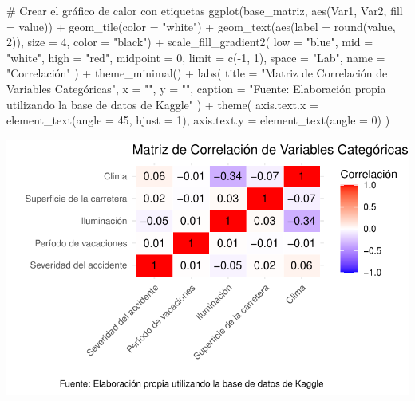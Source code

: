 \documentclass[
  letterpaper,
  DIV=11,
  numbers=noendperiod]{scrartcl}
\newenvironment{Shaded}{\begin{snugshade}}{\end{snugshade}}
\newcommand{\AttributeTok}[1]{\textcolor[rgb]{0.40,0.45,0.13}{#1}}
\newcommand{\CommentTok}[1]{\textcolor[rgb]{0.37,0.37,0.37}{#1}}
\newcommand{\DecValTok}[1]{\textcolor[rgb]{0.68,0.00,0.00}{#1}}
\newcommand{\FunctionTok}[1]{\textcolor[rgb]{0.28,0.35,0.67}{#1}}
\newcommand{\NormalTok}[1]{\textcolor[rgb]{0.00,0.23,0.31}{#1}}
\newcommand{\SpecialCharTok}[1]{\textcolor[rgb]{0.37,0.37,0.37}{#1}}
\newcommand{\StringTok}[1]{\textcolor[rgb]{0.13,0.47,0.30}{#1}}
\begin{document}
\begin{Shaded}
\begin{Highlighting}[]
\CommentTok{\# Crear el gráfico de calor con etiquetas}
\FunctionTok{ggplot}\NormalTok{(base\_matriz, }\FunctionTok{aes}\NormalTok{(Var1, Var2, }\AttributeTok{fill =}\NormalTok{ value)) }\SpecialCharTok{+}
  \FunctionTok{geom\_tile}\NormalTok{(}\AttributeTok{color =} \StringTok{"white"}\NormalTok{) }\SpecialCharTok{+}
  \FunctionTok{geom\_text}\NormalTok{(}\FunctionTok{aes}\NormalTok{(}\AttributeTok{label =} \FunctionTok{round}\NormalTok{(value, }\DecValTok{2}\NormalTok{)), }\AttributeTok{size =} \DecValTok{4}\NormalTok{, }\AttributeTok{color =} \StringTok{"black"}\NormalTok{) }\SpecialCharTok{+} 
  \FunctionTok{scale\_fill\_gradient2}\NormalTok{(}
    \AttributeTok{low =} \StringTok{"blue"}\NormalTok{, }\AttributeTok{mid =} \StringTok{"white"}\NormalTok{, }\AttributeTok{high =} \StringTok{"red"}\NormalTok{,}
    \AttributeTok{midpoint =} \DecValTok{0}\NormalTok{, }\AttributeTok{limit =} \FunctionTok{c}\NormalTok{(}\SpecialCharTok{{-}}\DecValTok{1}\NormalTok{, }\DecValTok{1}\NormalTok{), }\AttributeTok{space =} \StringTok{"Lab"}\NormalTok{, }\AttributeTok{name =} \StringTok{"Correlación"}
\NormalTok{  ) }\SpecialCharTok{+}
  \FunctionTok{theme\_minimal}\NormalTok{() }\SpecialCharTok{+}
  \FunctionTok{labs}\NormalTok{(}
    \AttributeTok{title =} \StringTok{"Matriz de Correlación de Variables Categóricas"}\NormalTok{,}
    \AttributeTok{x =} \StringTok{""}\NormalTok{, }\AttributeTok{y =} \StringTok{""}\NormalTok{,}
    \AttributeTok{caption =} \StringTok{"Fuente: Elaboración propia utilizando la base de datos de Kaggle"}
\NormalTok{  ) }\SpecialCharTok{+}
  \FunctionTok{theme}\NormalTok{(}
    \AttributeTok{axis.text.x =} \FunctionTok{element\_text}\NormalTok{(}\AttributeTok{angle =} \DecValTok{45}\NormalTok{, }\AttributeTok{hjust =} \DecValTok{1}\NormalTok{),}
    \AttributeTok{axis.text.y =} \FunctionTok{element\_text}\NormalTok{(}\AttributeTok{angle =} \DecValTok{0}\NormalTok{)}
\NormalTok{  )}
\end{Highlighting}
\end{Shaded}

\includegraphics{cod_bitacora2_files/figure-pdf/unnamed-chunk-5-1.pdf}
\end{document}
